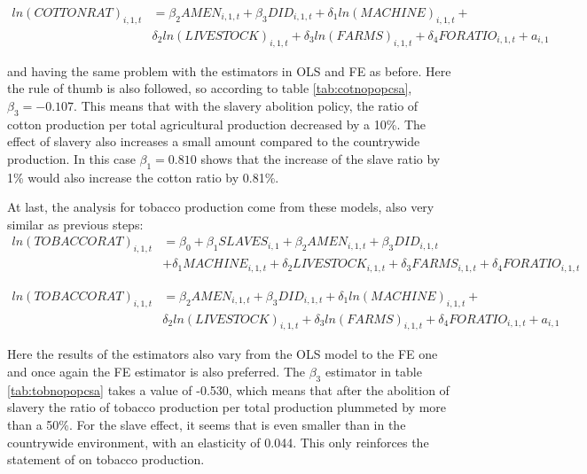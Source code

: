 \documentclass[12pt]{report}
\begin{document}
\begin{equation}
\begin{split}
ln(COTTONRAT)_{i,1,t} &=\beta_{2}AMEN_{i,1,t}+\beta_{3}DID_{i,1,t}+\delta_{1}ln(MACHINE)_{i,1,t}+
\\
&\delta_{2}ln(LIVESTOCK)_{i,1,t}+\delta_{3}ln(FARMS)_{i,1,t}+\delta_{4}FORATIO_{i,1,t} + a_{i,1}
\end{split}
\end{equation}

and having the same problem with the estimators in OLS and FE as before. Here the rule of thumb is also followed, so according to table \ref{tab:cotnopopcsa}, $\beta_{3}=-0.107$. This means that with the slavery abolition policy, the ratio of cotton production per total agricultural production decreased by a 10\%. The effect of slavery also increases a small amount compared to the countrywide production. In this case $\beta_{1}=0.810$ shows that the increase of the slave ratio by 1\% would also increase the cotton ratio by 0.81\%.

At last, the analysis for tobacco production come from these models, also very similar as previous steps:
\begin{equation}
\begin{split}
ln(TOBACCORAT)_{i,1,t} &=\beta_{0}+\beta_{1}SLAVES_{i,1}+\beta_{2}AMEN_{i,1,t}+\beta_{3}DID_{i,1,t}
\\
&+\delta_{1}MACHINE_{i,1,t}+\delta_{2}LIVESTOCK_{i,1,t}+\delta_{3}FARMS_{i,1,t}+\delta_{4}FORATIO_{i,1,t}
\end{split}
\end{equation}

\begin{equation}
\begin{split}
ln(TOBACCORAT)_{i,1,t} &=\beta_{2}AMEN_{i,1,t}+\beta_{3}DID_{i,1,t}+\delta_{1}ln(MACHINE)_{i,1,t}+
\\
&\delta_{2}ln(LIVESTOCK)_{i,1,t}+\delta_{3}ln(FARMS)_{i,1,t}+\delta_{4}FORATIO_{i,1,t} + a_{i,1}
\end{split}
\end{equation}

Here the results of the estimators also vary from the OLS model to the FE one and once again the FE estimator is also preferred. The $\beta_{3}$ estimator in table \ref{tab:tobnopopcsa} takes a value of -0.530, which means that after the abolition of slavery the ratio of tobacco production per total production plummeted by more than a 50\%. For the slave effect, it seems that  is even smaller than in the countrywide environment, with an elasticity of 0.044. This only reinforces the statement of \citet{wright2013slavery} on tobacco production.
\end{document}

